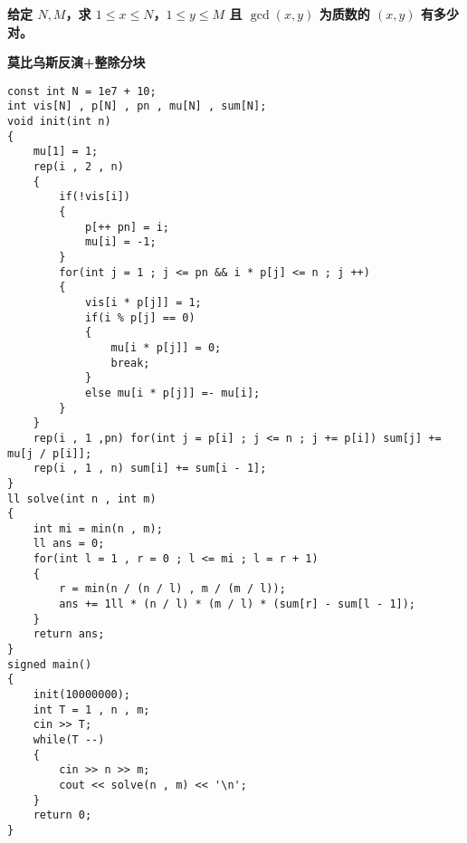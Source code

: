 \documentclass[E:/GsjzTle/main/main.tex]{subfiles}
\begin{document}
\textbf{给定 \(N, M\)，求 \(1 \leq x \leq N\)，\(1 \leq y \leq M\) 且
\(\gcd(x, y)\) 为质数的 \((x, y)\) 有多少对。}

\textbf{莫比乌斯反演+整除分块}

\begin{lstlisting}
const int N = 1e7 + 10;
int vis[N] , p[N] , pn , mu[N] , sum[N];
void init(int n)
{
	mu[1] = 1;
	rep(i , 2 , n)
	{
		if(!vis[i])
		{
			p[++ pn] = i;
			mu[i] = -1;
		}
		for(int j = 1 ; j <= pn && i * p[j] <= n ; j ++)
		{
			vis[i * p[j]] = 1;
			if(i % p[j] == 0)
			{
				mu[i * p[j]] = 0;
				break;
			}
			else mu[i * p[j]] =- mu[i];
		}
	}
	rep(i , 1 ,pn) for(int j = p[i] ; j <= n ; j += p[i]) sum[j] += mu[j / p[i]];
	rep(i , 1 , n) sum[i] += sum[i - 1];
}
ll solve(int n , int m)
{
	int mi = min(n , m);
	ll ans = 0;
	for(int l = 1 , r = 0 ; l <= mi ; l = r + 1)
	{
		r = min(n / (n / l) , m / (m / l));
		ans += 1ll * (n / l) * (m / l) * (sum[r] - sum[l - 1]);
	}
	return ans;
}
signed main()
{
	init(10000000);
	int T = 1 , n , m;
	cin >> T;
	while(T --) 
	{
		cin >> n >> m;
		cout << solve(n , m) << '\n';
	}
	return 0;
}
\end{lstlisting}
\end{document}
